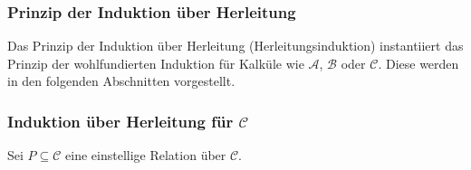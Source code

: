 			\subsubsection{Prinzip der Induktion über Herleitung}
				Das Prinzip der Induktion über Herleitung (Herleitungsinduktion) instantiiert das Prinzip der wohlfundierten Induktion für Kalküle wie $ \mathcal{A} $, $ \mathcal{B} $ oder $ \mathcal{C} $. Diese werden in den folgenden Abschnitten vorgestellt.



			\subsubsection{Induktion über Herleitung für $ \mathcal{C} $}
				Sei $ P \subseteq \mathcal{C} $ eine einstellige Relation über $ \mathcal{C} $.

